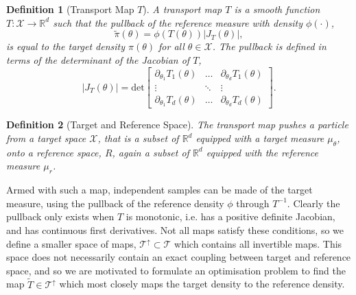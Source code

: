 \documentclass[final]{siamltex}
\newtheorem{dfn}{Definition}[section]
\begin{document}
\begin{dfn}[Transport Map $T$]
	A transport map $T$ is a smooth function $T\colon
        \mathcal{X}\rightarrow\mathbb{R}^d$ such that the {\it
          pullback} of the reference measure with density $\phi(\cdot)$,
	\begin{equation}\label{eq:pullback}
		\tilde{\pi}(\theta) = \phi(T(\theta))|J_T(\theta)|,
	\end{equation}
	is equal to the target density $\pi(\theta)$ for all $\theta \in \mathcal{X}$. The pullback is defined in terms of the determinant of the Jacobian of $T$,
	\[
		|J_T(\theta)| = \text{det}\begin{bmatrix} \partial_{\theta_1} T_1(\theta) & \dots & \partial_{\theta_d} T_1(\theta) \\ \vdots & \ddots & \vdots \\ \partial_{\theta_1} T_d(\theta) & \dots & \partial_{\theta_d} T_d(\theta) \end{bmatrix}.
	\]
\end{dfn}


\begin{dfn}[Target and Reference Space]
	The transport map pushes a particle from a {\it target space} $\mathcal{X}$, that is a subset of $\mathbb{R}^d$ equipped with a target measure $\mu_{\theta}$, onto a {\it reference space}, $R$, again a subset of $\mathbb{R}^d$ equipped with the reference measure $\mu_r$.
\end{dfn}

Armed with such a map, independent samples can be made of the target
measure, using the pullback of the reference density $\phi$ through $T^{-1}$.
Clearly the pullback only exists when $T$ is monotonic, i.e. has a positive definite Jacobian, and has continuous first derivatives.
Not all maps satisfy these conditions, so we define a smaller space of
maps, $\mathcal{T}^\uparrow \subset \mathcal{T}$ which contains all
invertible maps. This space does not necessarily contain an exact
coupling between target and reference space, and so we are motivated to formulate an optimisation problem to find the map $\tilde{T}
\in \mathcal{T}^\uparrow$ which most closely maps the target density
to the reference density.
\end{document}
